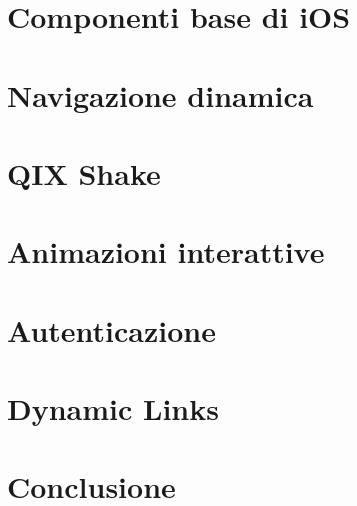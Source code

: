 \documentclass[12pt,a4paper]{book}
\begin{document}
    \chapter{Componenti base di iOS }
    \label{CH:2}
    

    \chapter{Navigazione dinamica}
    \label{CH:3}
    

    \chapter{QIX Shake}
    \label{CH:4}
    
    
    \chapter{Animazioni interattive}
    \label{CH:5}
    

    \chapter{Autenticazione}
    \label{CH:6}
    
    
    \chapter{Dynamic Links}
    \label{CH:7}
    
    
    \chapter*{Conclusione}
    \label{CH:Concl}
    
    
    
    
    
    \listoffigures
\end{document}
